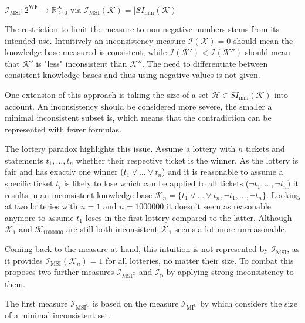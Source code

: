 \begin{definition}
    \(\mathcal{I}_{\text{MSI}}: 2^{\text{WF}} \rightarrow \mathbb{R}_{\geq 0}^{\infty} \text{ via } \mathcal{I}_{\text{MSI}}(\mathcal{K}) = \left| SI_{\min}(\mathcal{K}) \right|\)
\end{definition}

The restriction to limit the measure to non-negative numbers stems from its intended use. Intuitively an inconsistency measure \(\mathcal{I}(\mathcal{K}) = 0\) should mean the knowledge base measured is consistent, while \(\mathcal{I}(\mathcal{K}') < \mathcal{I}(\mathcal{K}'')\) should mean that \(\mathcal{K}'\) is "less" inconsistent than \(\mathcal{K}''\). The need to differentiate between consistent knowledge bases and thus using negative values is not given.

One extension of this approach is taking the size of a set \(\mathcal{H} \in SI_{\min}(\mathcal{K})\) into account. An inconsistency should be considered more severe, the smaller a minimal inconsistent subset is, which means that the contradiction can be represented with fewer formulas.

The lottery paradox \cite{kyburg_probability_1961} highlights this issue.
Assume a lottery with \(n\) tickets and statements \(t_1, \dots, t_n\) whether their respective ticket is the winner. As the lottery is fair and has exactly one winner (\(t_1 \lor \dots \lor t_n\)) and it is reasonable to assume a specific ticket \(t_i\) is likely to lose which can be applied to all tickets (\(\neg t_1, \dots, \neg t_n\)) it results in an inconsistent knowledge base \(\mathcal{K}_n = \{ t_1 \lor \dots \lor t_n, \neg t_1, \dots, \neg t_n \}\). Looking at two lotteries with \(n = 1\) and \(n = 1000000\) it doesn't seem as reasonable anymore to assume \(t_1\) loses in the first lottery compared to the latter. Although \(\mathcal{K}_1\) and \(\mathcal{K}_{1000000}\) are still both inconsistent \(\mathcal{K}_1\) seems a lot more unreasonable.

Coming back to the measure at hand, this intuition is not represented by \(\mathcal{I}_{\text{MSI}}\), as it provides \(\mathcal{I}_{\text{MSI}}(\mathcal{K}_n) = 1\) for all lotteries, no matter their size. To combat this \cite{ulbricht_handling_2020} proposes two further measures \(\mathcal{I}_{\text{MSI}^\text{C}}\) and \(\mathcal{I}_{\text{p}}\) by applying strong inconsistency to them.

The first measure \(\mathcal{I}_{\text{MSI}^\text{C}}\) is based on the measure \(\mathcal{I}_{\text{MI}^{\text{C}}}\) by \cite{hunter_measuring_2008} which considers the size of a minimal inconsistent set.

